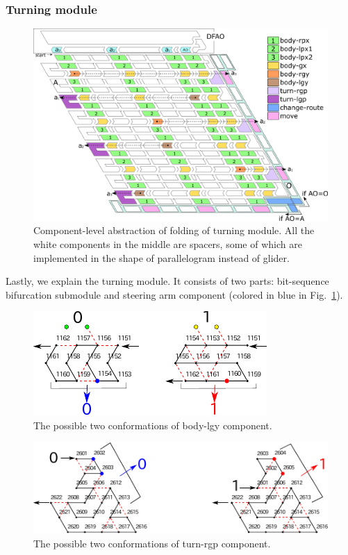 			\subsubsection{Turning module}

\begin{figure}[t]
\centering
\includegraphics[width=\linewidth]{pic/overall_turn_part.pdf}
\caption{
Component-level abstraction of folding of turning module.
All the white components in the middle are spacers, some of which are implemented in the shape of parallelogram instead of glider. 
 }
\label{fig:overall_turning}
\end{figure}

Lastly, we explain the turning module. 
It consists of two parts: bit-sequence bifurcation submodule and steering arm component (colored in blue in Fig.~\ref{fig:overall_turning}). 


\begin{figure}[h]
\centering
\includegraphics[width=0.5\linewidth]{pic/body-lgy.pdf}
\caption{The possible two conformations of body-lgy component.}
\label{fig:body-lgy}
\end{figure}

\begin{figure}[h]
\centering
\includegraphics[width=0.7\linewidth]{pic/turn-rgp.pdf}
\caption{The possible two conformations of turn-rgp component.}
\label{fig:turn-rgp}
\end{figure}

